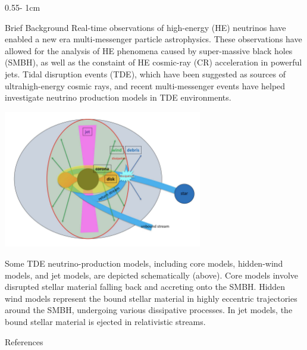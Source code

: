 \documentclass{../psuposter}
\begin{document}
\begin{frame}
\begin{columns}[t, totalwidth=\textwidth]
\begin{column}{0.55\textwidth - 1cm}
    \begin{block}{Brief Background}
        Real-time observations of high-energy (HE) neutrinos have enabled a new era  multi-messenger particle astrophysics. These observations have allowed for the analysis of HE phenomena caused by super-massive black holes (SMBH), as well as the constaint of HE cosmic-ray (CR) acceleration in powerful jets. \cite{muraseHighEnergyNeutrinoGammaRay2020} Tidal disruption events (TDE), which have been suggested as sources of ultrahigh-energy cosmic rays, and recent multi-messenger events have helped investigate neutrino production models in TDE environments.

        \begin{center}
		   	\includegraphics[width=0.65\textwidth]{images/production}    		
    	\end{center}
		 Some TDE neutrino-production models, including core models, hidden-wind models, and jet models, are depicted schematically (above). \cite{muraseHighEnergyNeutrinoGammaRay2020} Core models involve disrupted stellar material falling back and accreting onto the SMBH. Hidden wind models represent the bound stellar material in highly eccentric trajectories around the SMBH, undergoing various dissipative processes. In jet models, the bound stellar material is ejected in relativistic streams. \cite{muraseHighEnergyNeutrinoGammaRay2020}

    \end{block}


    \begin{block}{References}
        
%        
		
    \end{block}


\end{column}
\end{columns}
\end{frame}
\end{document}
